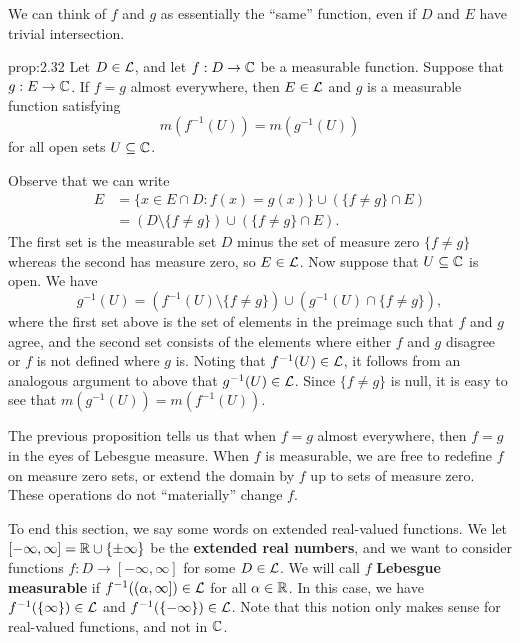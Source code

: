 We can think of $f$ and $g$ as essentially the ``same'' function, even if 
$D$ and $E$ have trivial intersection. 

\begin{prop}{prop:2.32}
    Let $D \in {\cal L}$, and let $f : D \to \mathbb{C}$ be a measurable function.
    Suppose that $g : E \to \mathbb{C}$. If $f = g$ almost everywhere, then 
    $E \in {\cal L}$ and $g$ is a measurable function satisfying 
    \[ m(f^{-1}(U)) = m(g^{-1}(U)) \] 
    for all open sets $U \subseteq \mathbb{C}$. 
\end{prop}
\begin{pf}
    Observe that we can write 
    \begin{align*}
        E &= \{x \in E \cap D : f(x) = g(x)\} \cup (\{f \neq g\} \cap E) \\ 
        &= (D \setminus \{f \neq g\}) \cup (\{f \neq g\} \cap E). 
    \end{align*}
    The first set is the measurable set $D$ minus the set of measure zero
    $\{f \neq g\}$ whereas the second has measure zero, so $E \in {\cal L}$. 
    Now suppose that $U \subseteq \mathbb{C}$ is open. We have 
    \[ g^{-1}(U) = (f^{-1}(U) \setminus \{f \neq g\}) \cup 
    (g^{-1}(U) \cap \{f \neq g\}), \] 
    where the first set above is the set of elements in the preimage such that 
    $f$ and $g$ agree, and the second set consists of the elements where 
    either $f$ and $g$ disagree or $f$ is not defined where $g$ is. 
    Noting that $f^{-1}(U) \in {\cal L}$, it follows from an analogous 
    argument to above that $g^{-1}(U) \in {\cal L}$. Since $\{f \neq g\}$
    is null, it is easy to see that $m(g^{-1}(U)) = m(f^{-1}(U))$. 
\end{pf}

The previous proposition tells us that when $f = g$ almost everywhere, then 
$f = g$ in the eyes of Lebesgue measure. When $f$ is measurable, we are 
free to redefine $f$ on measure zero sets, or extend the domain by $f$ 
up to sets of measure zero. These operations do not ``materially'' change $f$. 

To end this section, we say some words on extended real-valued functions. 
We let $[-\infty, \infty] = \mathbb{R} \cup \{\pm\infty\}$ be the {\bf extended 
real numbers}, and we want to consider functions $f : D \to [-\infty, 
\infty]$ for some $D \in {\cal L}$. We will call $f$ {\bf Lebesgue 
measurable} if $f^{-1}((\alpha, \infty]) \in {\cal L}$ for all 
$\alpha \in \mathbb{R}$. In this case, we have $f^{-1}(\{\infty\}) \in {\cal L}$ 
and $f^{-1}(\{-\infty\}) \in {\cal L}$. Note that this notion only makes 
sense for real-valued functions, and not in $\mathbb{C}$. 

